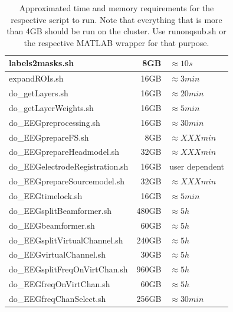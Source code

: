\documentclass[12pt,a4paper]{scrartcl}
\begin{document}
\begin{table}[h]
\begin{tabular}{l | r | l}
  labels2masks.sh & 8GB & $\approx 10s$ \\\hline
  expandROIs.sh & 16GB & $\approx 3min$ \\\hline
  do\_getLayers.sh & 16GB & $\approx 20min$ \\\hline
  do\_getLayerWeights.sh & 16GB & $\approx 5min$ \\\hline
  do\_EEGpreprocessing.sh & 16GB & $\approx 30min$ \\\hline
  do\_EEGprepareFS.sh & 8GB & $\approx XXXmin$ \\\hline
  do\_EEGprepareHeadmodel.sh & 32GB & $\approx XXXmin$ \\\hline
  do\_EEGelectrodeRegistration.sh & 16GB & user dependent \\\hline
  do\_EEGprepareSourcemodel.sh & 32GB & $\approx XXXmin$ \\\hline
  do\_EEGtimelock.sh & 16GB & $\approx 5min$ \\\hline
  do\_EEGsplitBeamformer.sh & 480GB & $\approx 5h$ \\\hline
  do\_EEGbeamformer.sh & 60GB & $\approx 5h$ \\\hline
  do\_EEGsplitVirtualChannel.sh & 240GB & $\approx 5h$ \\\hline
  do\_EEGvirtualChannel.sh & 30GB & $\approx 5h$ \\\hline
  do\_EEGsplitFreqOnVirtChan.sh & 960GB & $\approx 5h$ \\\hline
  do\_EEGfreqOnVirtChan.sh & 60GB & $\approx 5h$ \\\hline
  do\_EEGfreqChanSelect.sh & 256GB & $\approx 30min$ \\\bottomrule
\end{tabular}
\caption[Approximated time and memory requirements when running on qsub]{Approximated time and memory requirements for the respective script to run. Note that everything that is more than 4GB should be run on the cluster. Use runonqsub.sh or the respective MATLAB wrapper for that purpose.}
\label{tab:hardwarerequirements}
\end{table}
\end{document}
